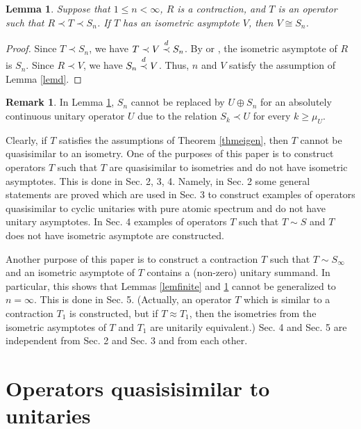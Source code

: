 \documentclass[a4paper,oneside,11pt]{amsart}
\numberwithin{equation}{section}
\theoremstyle{plain}
\newtheorem{lemma}[theorem]{Lemma}
\theoremstyle{definition}
\newtheorem{remark}[theorem]{Remark}
\begin{document}
\begin{lemma}\label{lemshift} Suppose that $1\leq n<\infty$, $R$ is a contraction, and $T$ is an operator such that $R\prec T\prec S_n$. 
If $T$ has an isometric asymptote $V$, then $V\cong  S_n$. 
\end{lemma}

\begin{proof}
 Since $T\prec S_n$, we have $T\prec V\buildrel d \over\prec S_n$. 
By {\cite[Lemma 2.1]{gam}} or {\cite[Proposition 9]{kersz}}, the isometric asymptote of $R$ is $S_n$. Since $R\prec V$, we have 
$S_n\buildrel d \over\prec V$. Thus, $n$ and $V$ satisfy the assumption of  Lemma \ref{lemd}.   
\end{proof}


\begin{remark}\label{remshift} In Lemma \ref{lemshift}, $S_n$ cannot be replaced by $U\oplus S_n$ for an absolutely continuous unitary operator $U$ 
due to the relation $S_k\prec U$ for every $k\geq\mu_U$. 
\end{remark}

Clearly, if $T$ satisfies the assumptions of Theorem \ref{thmeigen}, then $T$ cannot be quasisimilar to an isometry. 
One of the purposes of this paper is to construct operators $T$ such that $T$ are quasisimilar to  isometries and do not have 
isometric asymptotes. This is done in Sec. 2, 3, 4. Namely, in Sec. 2 some general statements are proved which are used in Sec. 3
to construct examples of operators quasisimilar to cyclic unitaries with pure atomic spectrum and do not have unitary asymptotes. 
In Sec. 4 examples of operators $T$ such that $T\sim S$ and $T$ does not have isometric asymptote are constructed.  

 Another  purpose of this paper is to construct a contraction $T$ such that $T\sim S_\infty$ and 
an isometric asymptote of $T$ contains a (non-zero) unitary summand.  In particular, this shows that Lemmas \ref{lemfinite} and \ref{lemshift} cannot be generalized
to $n=\infty$. This is done in Sec. 5. (Actually, an operator $T$ 
which is similar to a contraction $T_1$ is constructed, but if $T\approx T_1$, 
then the isometries from the isometric asymptotes of $T$ and $T_1$ are unitarily equivalent.) 
Sec. 4 and Sec. 5 are independent from Sec. 2 and Sec. 3 and from each other.  



\section{Operators quasisisimilar to unitaries}
\end{document}
